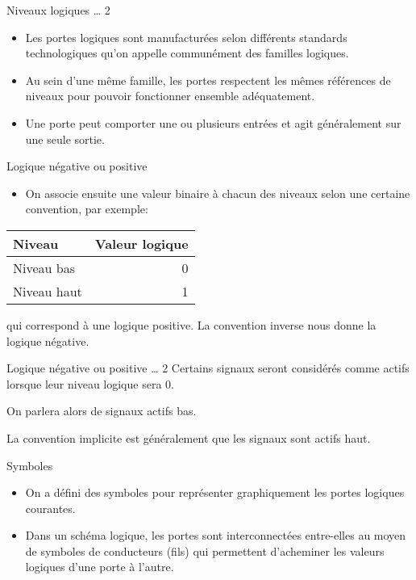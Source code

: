 \documentclass[presentation]{beamer}
\begin{document}
\begin{frame}[label={sec:org2af7373}]{Niveaux logiques \ldots{} 2}
\begin{itemize}
\item Les portes logiques sont manufacturées selon différents standards technologiques qu'on appelle communément des \alert{familles logiques}.

\item Au sein d'une même famille, les portes respectent les mêmes références de niveaux pour pouvoir fonctionner ensemble adéquatement.

\item Une porte peut comporter une ou plusieurs entrées et agit généralement sur une seule sortie.
\end{itemize}
\end{frame}

\begin{frame}[label={sec:org693a84d}]{Logique négative ou positive}
\begin{itemize}
\item On associe ensuite une valeur binaire à chacun des niveaux selon une certaine convention, par exemple:
\end{itemize}
\begin{center}
\begin{tabular}{lr}
Niveau & Valeur logique\\[0pt]
\hline
Niveau bas & 0\\[0pt]
Niveau haut & 1\\[0pt]
\end{tabular}
\end{center}
qui correspond à une logique positive. La convention inverse nous donne la logique négative.
\end{frame}

\begin{frame}[label={sec:org58133bb}]{Logique négative ou positive \ldots{} 2}
Certains signaux seront considérés comme actifs lorsque leur niveau logique sera 0.

On parlera alors de signaux \alert{actifs bas}.

La convention implicite est généralement que les signaux sont \alert{actifs haut}.
\end{frame}

\begin{frame}[label={sec:org968ae7e}]{Symboles}
\begin{itemize}
\item On a défini des symboles pour représenter graphiquement les portes logiques courantes.

\item Dans un schéma logique, les portes sont interconnectées entre-elles au moyen de symboles de conducteurs (fils) qui permettent d'acheminer les valeurs logiques d'une porte à l'autre.
\end{itemize}
\end{frame}
\end{document}
